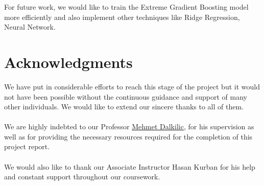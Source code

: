\documentclass[fleqn,10pt]{SelfArx} %
\begin{document}
For future work, we would like to train the Extreme Gradient Boosting model more efficiently and also implement other techniques like Ridge Regression, Neural Network.
\section*{Acknowledgments} %

We have put in considerable efforts to reach this stage of the project but it would not have been possible without the continuous guidance and support of many other individuals. We would like to extend our sincere thanks to all of them.
\\ \\ We are highly indebted to our Professor \href{https://www.soic.indiana.edu/all-people/profile.html?profile_id=187}{Mehmet Dalkilic}, for his supervision as well as for providing the necessary resources required for the completion of this project report.
\\ \\ We would also like to thank our Associate Instructor Hasan Kurban for his help and constant support throughout our coursework.






\end{document}
